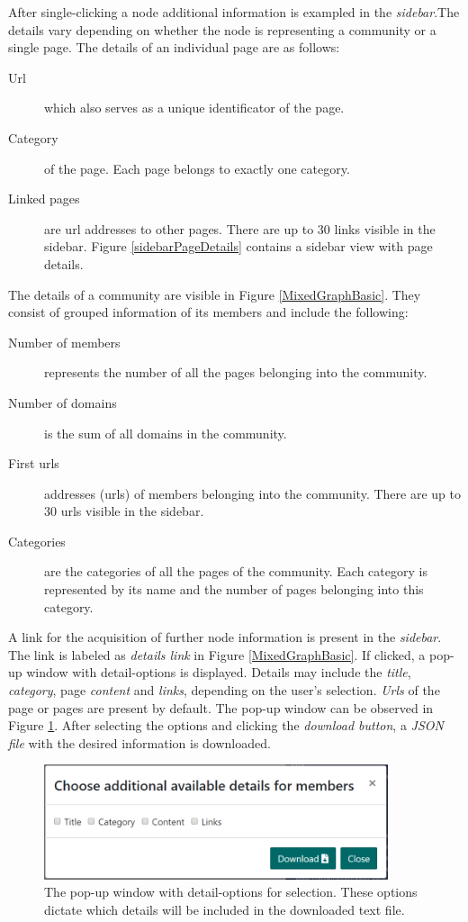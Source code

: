 After single-clicking a node additional information is exampled in the \textit{sidebar}.The details vary depending on whether the node is representing a community or a single page.
The details of an individual page are as follows: 
\begin {description}
	\item [Url] which also serves as a unique identificator of the page. 
	\item [Category] of the page. Each page belongs to exactly one category.
	\item[Linked pages] are url addresses to other pages. There are up to 30 links visible in the sidebar. 
Figure \ref{sidebarPageDetails} contains a sidebar view with page details.
\end{description}

The details of a community are visible in Figure \ref{MixedGraphBasic}. They consist of grouped information of its members and include the following:
\begin {description}
	\item[Number of members] represents the number of all the pages belonging into the community. 
	\item [Number of domains] is the sum of all domains in the community.
	\item [First urls] addresses (urls) of members belonging into the community. There are up to 30 urls visible in the sidebar. 
	\item [Categories] are the categories of all the pages of the community. Each category is represented by its name and the number of pages belonging into this category.
\end{description}

A link for the acquisition of further node information is present in the \textit{sidebar}. The link is labeled as \textit{details link} in Figure \ref{MixedGraphBasic}. If clicked, a pop-up window with detail-options is displayed. Details may include the \textit{title}, \textit{category}, page \textit{content} and \textit{links}, depending on the user's selection. \textit{Urls} of the page or pages are present by default. The pop-up window can be observed in Figure \ref{detailsOptionsPopup}. After selecting the options and clicking the \textit{download button}, a \textit{JSON file} with the desired information is downloaded.
\begin{figure}[ht!]
  \centering
  \includegraphics[width=0.9\textwidth]{Images/options_popup.png}
  \caption{The pop-up window with detail-options for selection. These options dictate which details will be included in the downloaded text file.}
  \label{detailsOptionsPopup}
\end{figure} 

